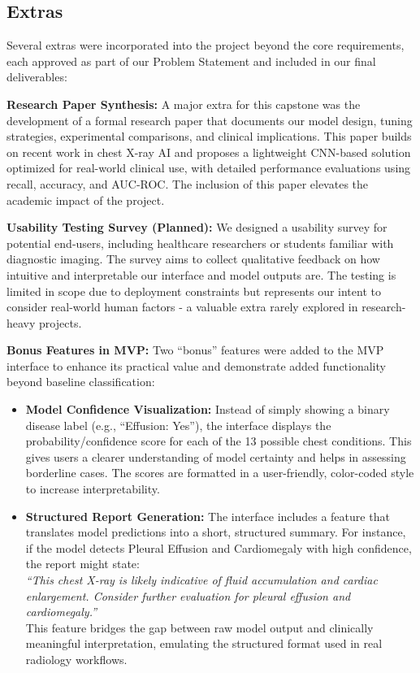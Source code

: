 \documentclass{article}
\begin{document}
\subsection{Extras}

Several extras were incorporated into the project beyond the core requirements, each approved as part of our Problem Statement and included in our final deliverables:

\textbf{Research Paper Synthesis:}
A major extra for this capstone was the development of a formal research paper that documents our model design, tuning strategies, experimental comparisons, and clinical implications. This paper builds on recent work in chest X-ray AI and proposes a lightweight CNN-based solution optimized for real-world clinical use, with detailed performance evaluations using recall, accuracy, and AUC-ROC. The inclusion of this paper elevates the academic impact of the project.

\textbf{Usability Testing Survey (Planned):}
We designed a usability survey for potential end-users, including healthcare researchers or students familiar with diagnostic imaging. The survey aims to collect qualitative feedback on how intuitive and interpretable our interface and model outputs are. The testing is limited in scope due to deployment constraints but represents our intent to consider real-world human factors - a valuable extra rarely explored in research-heavy projects.

\textbf{Bonus Features in MVP:}
Two ``bonus'' features were added to the MVP interface to enhance its practical value and demonstrate added functionality beyond baseline classification:

\begin{itemize}
    \item \textbf{Model Confidence Visualization:} Instead of simply showing a binary disease label (e.g., ``Effusion: Yes''), the interface displays the probability/confidence score for each of the 13 possible chest conditions. This gives users a clearer understanding of model certainty and helps in assessing borderline cases. The scores are formatted in a user-friendly, color-coded style to increase interpretability.
    
    \item \textbf{Structured Report Generation:} The interface includes a feature that translates model predictions into a short, structured summary. For instance, if the model detects Pleural Effusion and Cardiomegaly with high confidence, the report might state: \\
    \emph{``This chest X-ray is likely indicative of fluid accumulation and cardiac enlargement. Consider further evaluation for pleural effusion and cardiomegaly.''} \\
    This feature bridges the gap between raw model output and clinically meaningful interpretation, emulating the structured format used in real radiology workflows.
\end{itemize}
\end{document}
